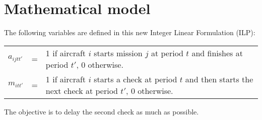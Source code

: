 \documentclass{roadef}
\begin{document}
\section{Mathematical model}
		
    The following variables are defined in this new Integer Linear Formulation (ILP):
		
    \begin{tabular}{p{5mm}lp{130mm}}
        $a_{ijtt'}$ & =& 1 if aircraft $i$ starts mission $j$ at period $t$ and finishes at period $t'$, 0 otherwise. \\  
        $m_{itt'}$  & =& 1 if aircraft $i$ starts a check at period $t$ and then starts the next check at period $t'$, 0 otherwise. \\
    \end{tabular}

    The objective is to delay the second check as much as possible.
    
\end{document}
